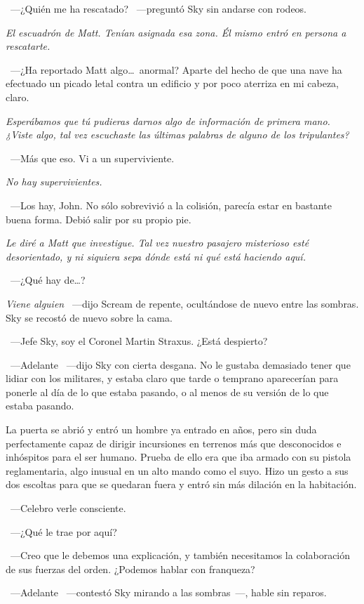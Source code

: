 ~---¿Quién me ha rescatado? ~---preguntó Sky sin andarse con rodeos.

\emph{El escuadrón de Matt. Tenían asignada esa zona. Él mismo entró en persona a rescatarte.}

~---¿Ha reportado Matt algo\dots\ anormal? Aparte del hecho de que una nave ha efectuado un picado letal contra un edificio y por poco aterriza en mi cabeza, claro.

\emph{Esperábamos que tú pudieras darnos algo de información de primera mano. ¿Viste algo, tal vez escuchaste las últimas palabras de alguno de los tripulantes?}

~---Más que eso. Vi a un superviviente.

\emph{No hay supervivientes.}

~---Los hay, John. No sólo sobrevivió a la colisión, parecía estar en bastante buena forma. Debió salir por su propio pie.

\emph{Le diré a Matt que investigue. Tal vez nuestro pasajero misterioso esté desorientado, y ni siquiera sepa dónde está ni qué está haciendo aquí.}

~---¿Qué hay de\dots?

\emph{Viene alguien} ~---dijo Scream de repente, ocultándose de nuevo entre las sombras. Sky se recostó de nuevo sobre la cama.

~---Jefe Sky, soy el Coronel Martin Straxus. ¿Está despierto?

~---Adelante ~---dijo Sky con cierta desgana. No le gustaba demasiado tener que lidiar con los militares, y estaba claro que tarde o temprano aparecerían para ponerle al día de lo que estaba pasando, o al menos de su versión de lo que estaba pasando.

La puerta se abrió y entró un hombre ya entrado en años, pero sin duda perfectamente capaz de dirigir incursiones en terrenos más que desconocidos e inhóspitos para el ser humano. Prueba de ello era que iba armado con su pistola reglamentaria, algo inusual en un alto mando como el suyo. Hizo un gesto a sus dos escoltas para que se quedaran fuera y entró sin más dilación en la habitación.

~---Celebro verle consciente.

~---¿Qué le trae por aquí?

~---Creo que le debemos una explicación, y también necesitamos la colaboración de sus fuerzas del orden. ¿Podemos hablar con franqueza?

~---Adelante ~---contestó Sky mirando a las sombras~---, hable sin reparos.

